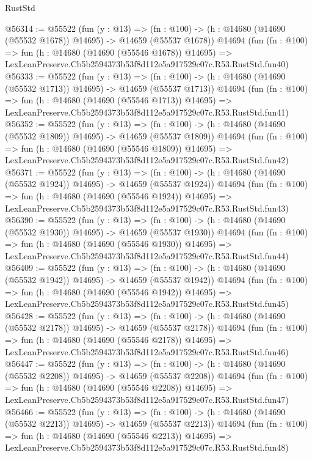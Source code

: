 \begin{lexlean}{RustStd}
\begin{coremodule}
@56314 := @55522
    (fun (y : @13) =>
    (fn : @100) -> (h : @14680 (@14690 (@55532 @1678)) @14695) -> @14659 (@55537 @1678))
    @14694
    (fun (fn : @100) =>
    fun (h : @14680 (@14690 (@55546 @1678)) @14695) =>
    LexLeanPreserve.Cb5b2594373b53f8d112e5a917529c07c.R53.RustStd.fun40)
@56333 := @55522
    (fun (y : @13) =>
    (fn : @100) -> (h : @14680 (@14690 (@55532 @1713)) @14695) -> @14659 (@55537 @1713))
    @14694
    (fun (fn : @100) =>
    fun (h : @14680 (@14690 (@55546 @1713)) @14695) =>
    LexLeanPreserve.Cb5b2594373b53f8d112e5a917529c07c.R53.RustStd.fun41)
@56352 := @55522
    (fun (y : @13) =>
    (fn : @100) -> (h : @14680 (@14690 (@55532 @1809)) @14695) -> @14659 (@55537 @1809))
    @14694
    (fun (fn : @100) =>
    fun (h : @14680 (@14690 (@55546 @1809)) @14695) =>
    LexLeanPreserve.Cb5b2594373b53f8d112e5a917529c07c.R53.RustStd.fun42)
@56371 := @55522
    (fun (y : @13) =>
    (fn : @100) -> (h : @14680 (@14690 (@55532 @1924)) @14695) -> @14659 (@55537 @1924))
    @14694
    (fun (fn : @100) =>
    fun (h : @14680 (@14690 (@55546 @1924)) @14695) =>
    LexLeanPreserve.Cb5b2594373b53f8d112e5a917529c07c.R53.RustStd.fun43)
@56390 := @55522
    (fun (y : @13) =>
    (fn : @100) -> (h : @14680 (@14690 (@55532 @1930)) @14695) -> @14659 (@55537 @1930))
    @14694
    (fun (fn : @100) =>
    fun (h : @14680 (@14690 (@55546 @1930)) @14695) =>
    LexLeanPreserve.Cb5b2594373b53f8d112e5a917529c07c.R53.RustStd.fun44)
@56409 := @55522
    (fun (y : @13) =>
    (fn : @100) -> (h : @14680 (@14690 (@55532 @1942)) @14695) -> @14659 (@55537 @1942))
    @14694
    (fun (fn : @100) =>
    fun (h : @14680 (@14690 (@55546 @1942)) @14695) =>
    LexLeanPreserve.Cb5b2594373b53f8d112e5a917529c07c.R53.RustStd.fun45)
@56428 := @55522
    (fun (y : @13) =>
    (fn : @100) -> (h : @14680 (@14690 (@55532 @2178)) @14695) -> @14659 (@55537 @2178))
    @14694
    (fun (fn : @100) =>
    fun (h : @14680 (@14690 (@55546 @2178)) @14695) =>
    LexLeanPreserve.Cb5b2594373b53f8d112e5a917529c07c.R53.RustStd.fun46)
@56447 := @55522
    (fun (y : @13) =>
    (fn : @100) -> (h : @14680 (@14690 (@55532 @2208)) @14695) -> @14659 (@55537 @2208))
    @14694
    (fun (fn : @100) =>
    fun (h : @14680 (@14690 (@55546 @2208)) @14695) =>
    LexLeanPreserve.Cb5b2594373b53f8d112e5a917529c07c.R53.RustStd.fun47)
@56466 := @55522
    (fun (y : @13) =>
    (fn : @100) -> (h : @14680 (@14690 (@55532 @2213)) @14695) -> @14659 (@55537 @2213))
    @14694
    (fun (fn : @100) =>
    fun (h : @14680 (@14690 (@55546 @2213)) @14695) =>
    LexLeanPreserve.Cb5b2594373b53f8d112e5a917529c07c.R53.RustStd.fun48)

\end{coremodule}
\end{lexlean}
